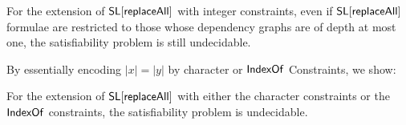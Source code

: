 %
 



\begin{theorem}\label{thm-ext-int-strong}
	For the extension of $\mathsf{SL}[\mathsf{replaceAll}]$ with integer constraints, even if $\mathsf{SL}[\mathsf{replaceAll}]$ formulae are restricted to those whose dependency graphs are of depth at most one, the satisfiability problem is still undecidable.
\end{theorem}

By essentially encoding $|x|=|y|$ by character or $\mathsf{IndexOf}$ Constraints, we show:

\begin{proposition}
	For the extension of $\mathsf{SL}[\mathsf{replaceAll}]$ with either the character constraints or the $\mathsf{IndexOf}$ constraints, the satisfiability problem is undecidable. 
\end{proposition}

